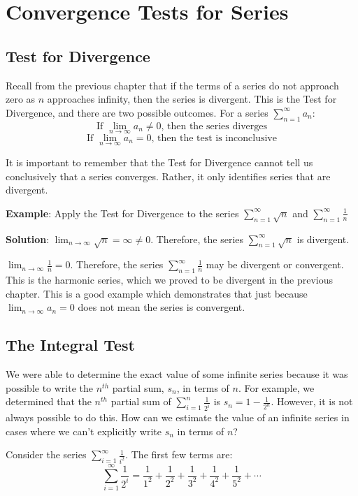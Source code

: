 \chapter{Convergence Tests for Series}

\section{Test for Divergence}
Recall from the previous chapter that if the terms of a series do not approach 
zero as $n$ approaches infinity, then the series is divergent. This is the 
Test for Divergence, and there are two possible 
outcomes. For a series $\sum_{n = 1}^\infty a_n$:
$$\text{If } \lim_{n \to \infty} a_n \neq 0 \text{, then the series diverges}$$
$$\text{If } \lim_{n \to \infty} a_n = 0 \text{, then the test is inconclusive}$$

It is important to remember that the Test for Divergence cannot tell us 
conclusively that a series converges. Rather, it only identifies series that 
are divergent. 

\textbf{Example}: Apply the Test for Divergence to the series $\sum_{n=1}^
\infty \sqrt{n}$ and $\sum_{n=1}^\infty \frac{1}{n}$

\textbf{Solution}: $\lim_{n \to \infty} \sqrt{n} = \infty \neq 0$. Therefore, 
the series $\sum_{n=1}^\infty \sqrt{n}$ is divergent. 

$\lim_{n \to \infty} \frac{1}{n} = 0$. Therefore, the series $\sum_{n=1}^
\infty \frac{1}{n}$ may be divergent or convergent. This is the harmonic 
series, which we proved to be divergent in the previous chapter. This is a 
good example which demonstrates that just because $\lim_{n \to \infty} a_n = 
0$ does not mean the series is convergent. 

\section{The Integral Test}
We were able to determine the exact value of some infinite series because it 
was possible to write the $n^{th}$ partial sum, $s_n$, in terms of $n$. For 
example, we determined that the $n^{th}$ partial sum of $\sum_{i = 1}^n 
\frac{1}{2^i}$ is $s_n = 1 - \frac{1}{2^n}$. However, it is not always possible 
to do this. How can we estimate the value of an infinite series in cases where 
we can't explicitly write $s_n$ in terms of $n$? 

Consider the series $\sum_{i = 1}^\infty \frac{1}{i^2}$. The first few terms 
are:
$$\sum_{i = 1}^\infty \frac{1}{2^i} = \frac{1}{1^2} + \frac{1}{2^2} + 
\frac{1}{3^2} + \frac{1}{4^2} + \frac{1}{5^2} + \cdots$$

